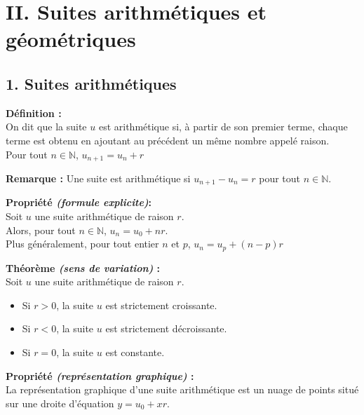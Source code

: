 \documentclass[11pt,a4paper]{article}
\begin{document}
\newpage

\section*{II. Suites arithmétiques et géométriques}
\subsection*{1. Suites arithmétiques}
\begin{mdframed}[style=definitionStyle]
  \textbf{Définition :} ~\\
  On dit que la suite $u$ est arithmétique si, à partir de son premier terme, chaque terme est obtenu en ajoutant au
  précédent un même nombre appelé raison. \\
  Pour tout $n\in\mathbb{N}$, $u_{n+1}=u_n+r$
\end{mdframed}

\textbf{Remarque :} Une suite est arithmétique si $u_{n+1}-u_n=r$ pour tout $n\in\mathbb{N}$.

\begin{mdframed}[style=proprieteStyle]
    \textbf{Propriété \emph{(formule explicite)}:} ~\\
    Soit $u$ une suite arithmétique de raison $r$. \\
    Alors, pour tout $n\in\mathbb{N}$, $u_n=u_0+nr$. \\
    Plus généralement, pour tout entier $n$ et $p$, $u_n=u_p+(n-p)r$
\end{mdframed}

\begin{mdframed}[style=proprieteStyle]
    \textbf{Théorème \emph{(sens de variation)} :} ~\\
    Soit $u$ une suite arithmétique de raison $r$.
    \begin{itemize}
      \item Si $r>0$, la suite $u$ est strictement croissante.
      \item Si $r<0$, la suite $u$ est strictement décroissante.
      \item Si $r=0$, la suite $u$ est constante.
    \end{itemize}
\end{mdframed}

\begin{mdframed}[style=proprieteStyle]
    \textbf{Propriété \emph{(représentation graphique)} :} ~\\
    La représentation graphique d'une suite arithmétique est un nuage de points situé sur une droite d'équation $y=u_0+xr$.
\end{mdframed}
\end{document}
